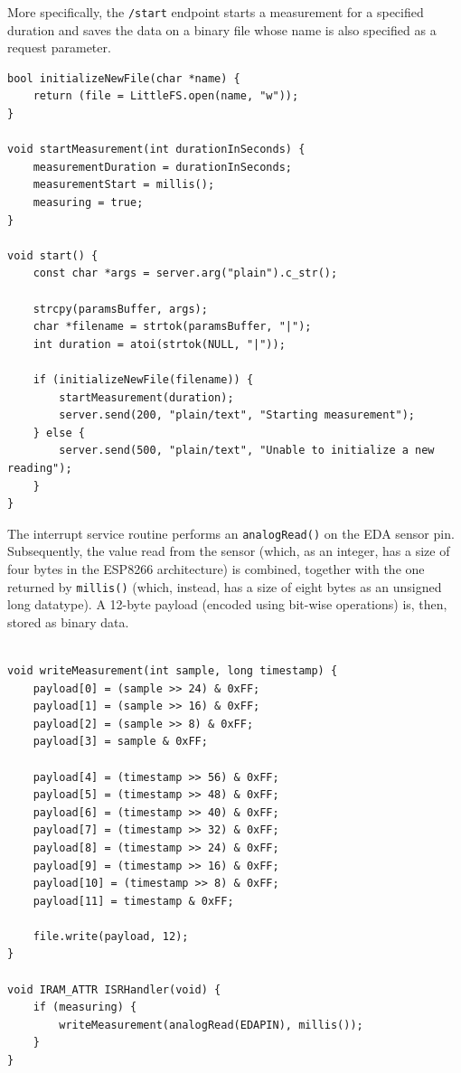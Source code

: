 More specifically, the \texttt{/start} endpoint starts a measurement for a specified duration and saves the data on a binary file whose name is also specified as a request parameter.

\begin{verbatim}
bool initializeNewFile(char *name) {
    return (file = LittleFS.open(name, "w"));
}

void startMeasurement(int durationInSeconds) {
    measurementDuration = durationInSeconds;
    measurementStart = millis();
    measuring = true;
}

void start() {
    const char *args = server.arg("plain").c_str();

    strcpy(paramsBuffer, args);
    char *filename = strtok(paramsBuffer, "|");
    int duration = atoi(strtok(NULL, "|"));

    if (initializeNewFile(filename)) {
        startMeasurement(duration);
        server.send(200, "plain/text", "Starting measurement");
    } else {
        server.send(500, "plain/text", "Unable to initialize a new reading");
    }
}
\end{verbatim}

The interrupt service routine performs an \texttt{analogRead()} on the EDA sensor pin. Subsequently, the value read from the sensor (which, as an integer, has a size of four bytes in the ESP8266 architecture) is combined, together with the one returned by \texttt{millis()} (which, instead, has a size of eight bytes as an unsigned long datatype). A 12-byte payload (encoded using bit-wise operations) is, then, stored as binary data.


\pagebreak

\begin{verbatim}

void writeMeasurement(int sample, long timestamp) {
    payload[0] = (sample >> 24) & 0xFF;
    payload[1] = (sample >> 16) & 0xFF;
    payload[2] = (sample >> 8) & 0xFF;
    payload[3] = sample & 0xFF;  

    payload[4] = (timestamp >> 56) & 0xFF;
    payload[5] = (timestamp >> 48) & 0xFF;
    payload[6] = (timestamp >> 40) & 0xFF;
    payload[7] = (timestamp >> 32) & 0xFF;
    payload[8] = (timestamp >> 24) & 0xFF;
    payload[9] = (timestamp >> 16) & 0xFF;
    payload[10] = (timestamp >> 8) & 0xFF;
    payload[11] = timestamp & 0xFF;

    file.write(payload, 12);
}

void IRAM_ATTR ISRHandler(void) {
    if (measuring) {
        writeMeasurement(analogRead(EDAPIN), millis());
    }
}
\end{verbatim}

